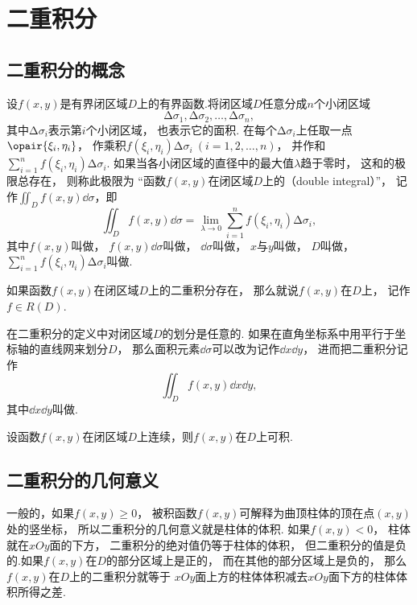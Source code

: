 \section{二重积分}
\subsection{二重积分的概念}
设\(f(x,y)\)是有界闭区域\(D\)上的有界函数.将闭区域\(D\)任意分成\(n\)个小闭区域\[
	\increment\sigma_1,\increment\sigma_2,\dotsc,\increment\sigma_n,
\]
其中\(\increment\sigma_i\)表示第\(i\)个小闭区域，
也表示它的面积.
在每个\(\increment\sigma_i\)上任取一点\(\opair{\xi_i,\eta_i}\)，
作乘积\(f(\xi_i,\eta_i) \increment\sigma_i\ (i=1,2,\dotsc,n)\)，
并作和\(\sum_{i=1}^n f(\xi_i,\eta_i) \increment\sigma_i\).
如果当各小闭区域的直径中的最大值\(\lambda\)趋于零时，
这和的极限总存在，
则称此极限为
“函数\(f(x,y)\)在闭区域\(D\)上的（double integral）”，
记作\(\iint_D f(x,y) \dd{\sigma}\)，即
\[
	\iint_D f(x,y) \dd{\sigma}
	= \lim_{\lambda\to0}
	\sum_{i=1}^n f(\xi_i,\eta_i) \increment\sigma_i,
\]
其中\(f(x,y)\)叫做，
\(f(x,y) \dd{\sigma}\)叫做，
\(\dd{\sigma}\)叫做，
\(x\)与\(y\)叫做，
\(D\)叫做，
\(\sum_{i=1}^n f(\xi_i,\eta_i) \increment\sigma_i\)叫做.

如果函数\(f(x,y)\)在闭区域\(D\)上的二重积分存在，
那么就说\(f(x,y)\)在\(D\)上，
记作\(f \in R(D)\).

在二重积分的定义中对闭区域\(D\)的划分是任意的.
如果在直角坐标系中用平行于坐标轴的直线网来划分\(D\)，
那么面积元素\(\dd{\sigma}\)可以改为记作\(\dd{x}\dd{y}\)，
进而把二重积分记作\[
	\iint_{D}{f(x,y)\dd{x}\dd{y}},
\]
其中\(\dd{x}\dd{y}\)叫做.

\begin{theorem}[充分条件]
设函数\(f(x,y)\)在闭区域\(D\)上连续，则\(f(x,y)\)在\(D\)上可积.
\end{theorem}

\subsection{二重积分的几何意义}
一般的，如果\(f(x,y) \geq 0\)，
被积函数\(f(x,y)\)可解释为曲顶柱体的顶在点\((x,y)\)处的竖坐标，
所以二重积分的几何意义就是柱体的体积.
如果\(f(x,y) < 0\)，
柱体就在\(xOy\)面的下方，
二重积分的绝对值仍等于柱体的体积，
但二重积分的值是负的.如果\(f(x,y)\)在\(D\)的部分区域上是正的，
而在其他的部分区域上是负的，
那么\(f(x,y)\)在\(D\)上的二重积分就等于
\(xOy\)面上方的柱体体积减去\(xOy\)面下方的柱体体积所得之差.

